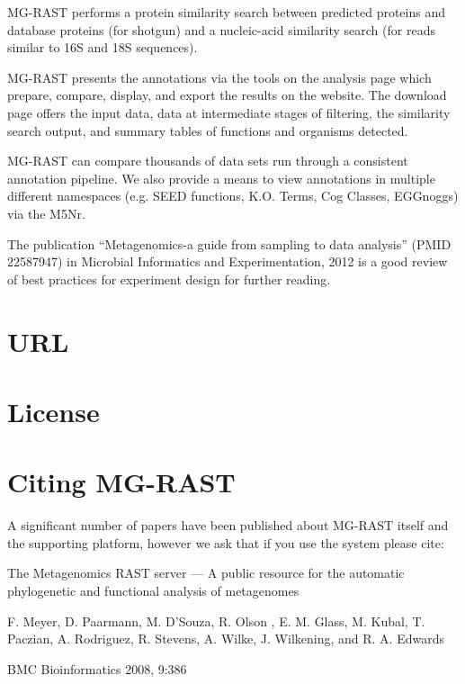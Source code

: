 \documentclass[letterpaper,10pt,english]{sphinxmanual}
\begin{document}
MG-RAST performs a protein similarity search between predicted proteins
and database proteins (for shotgun) and a nucleic-acid similarity search
(for reads similar to 16S and 18S sequences).

MG-RAST presents the annotations via the tools on the analysis page
which prepare, compare, display, and export the results on the website.
The download page offers the input data, data at intermediate stages of
filtering, the similarity search output, and summary tables of functions
and organisms detected.

MG-RAST can compare thousands of data sets run through a consistent
annotation pipeline. We also provide a means to view annotations in
multiple different namespaces (e.g. SEED functions, K.O. Terms, Cog
Classes, EGGnoggs) via the M5Nr.

The publication “Metagenomics-a guide from sampling to data analysis”
(PMID 22587947) in Microbial Informatics and Experimentation, 2012 is a
good review of best practices for experiment design for further reading.


\section{URL}
\label{\detokenize{user_manual:url}}\label{\detokenize{user_manual:section-mg-rast-url}}
 


\section{License}
\label{\detokenize{user_manual:license}}\label{\detokenize{user_manual:section-license}}

\section{Citing MG-RAST}
\label{\detokenize{user_manual:citing-mg-rast}}\label{\detokenize{user_manual:section-mg-rast-citation}}
\begin{DUlineblock}{0em}
\item[] A significant number of papers have been published about MG-RAST
itself and the supporting platform, however we ask that if you use the
system please cite:
\item[] The Metagenomics RAST server — A public resource for the automatic
phylogenetic and functional analysis of metagenomes
\item[] F. Meyer, D. Paarmann, M. D’Souza, R. Olson , E. M. Glass, M. Kubal,
T. Paczian, A. Rodriguez, R. Stevens, A. Wilke, J. Wilkening, and R.
A. Edwards
\item[] BMC Bioinformatics 2008, 9:386
\end{DUlineblock}
\end{document}
